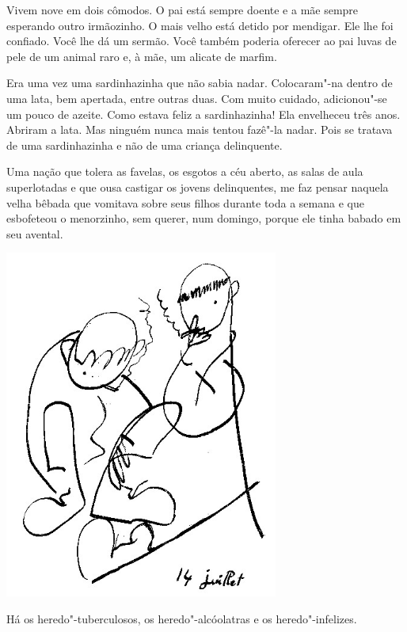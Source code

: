 Vivem nove em dois cômodos. O pai está sempre doente e a mãe sempre
esperando outro irmãozinho. O mais velho está detido por mendigar. Ele
lhe foi confiado. Você lhe dá um sermão. Você também poderia oferecer ao
pai luvas de pele de um animal raro e, à mãe, um alicate de marfim.

\bigskip
\bigskip

Era uma vez uma sardinhazinha que não sabia nadar. Colocaram"-na dentro
de uma lata, bem apertada, entre outras duas. Com muito cuidado,
adicionou"-se um pouco de azeite. Como estava feliz a sardinhazinha! Ela
envelheceu três anos. Abriram a lata. Mas ninguém nunca mais tentou
fazê"-la nadar. Pois se tratava de uma sardinhazinha e não de uma criança
delinquente.

\bigskip
\bigskip

Uma nação que tolera as favelas, os esgotos a céu aberto, as salas de
aula superlotadas e que ousa castigar os jovens delinquentes, me faz
pensar naquela velha bêbada que vomitava sobre seus filhos durante toda
a semana e que esbofeteou o menorzinho, sem querer, num domingo, porque
ele tinha babado em seu avental.

\bigskip
\bigskip

\begin{center}
\includegraphics[width=90mm]{./imgs/Image_13.jpg}
\end{center}

Há os heredo"-tuberculosos, os heredo"-alcóolatras e os heredo"-infelizes.


